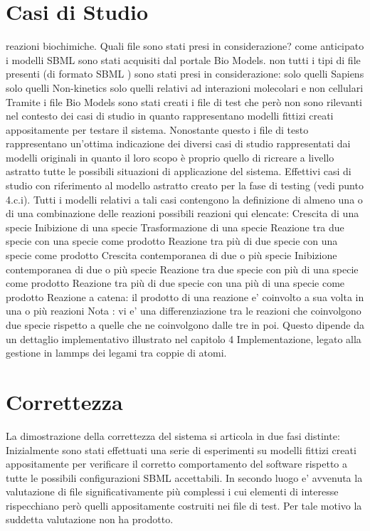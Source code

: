 \documentclass[Lau, oneside]{sapthesis}
\begin{document}
\section{Casi di Studio}
\label{sec:cast}
reazioni biochimiche.
Quali file sono stati presi in considerazione?
come anticipato i modelli SBML sono stati acquisiti dal portale Bio Models.
non tutti i tipi di file presenti (di formato SBML ) sono stati presi in considerazione:
solo quelli Sapiens
solo quelli Non-kinetics
solo quelli relativi ad interazioni molecolari e non cellulari
Tramite i file Bio Models sono stati creati i file di test che però non sono rilevanti nel contesto dei casi di studio in quanto rappresentano modelli fittizi creati appositamente per testare il sistema.
Nonostante questo i file di testo rappresentano un'ottima indicazione dei diversi casi di studio rappresentati dai modelli originali in quanto il loro scopo è proprio quello di ricreare a livello astratto tutte le possibili situazioni di applicazione del sistema.
Effettivi casi di studio con riferimento al modello astratto creato per la fase di testing (vedi punto 4.c.i). Tutti i modelli relativi a tali casi contengono la definizione di almeno una o di una combinazione delle reazioni possibili reazioni qui elencate:
Crescita di una specie
Inibizione di una specie
Trasformazione di una specie
Reazione tra due specie con una specie come prodotto 
Reazione tra più di due specie con una specie come prodotto
Crescita contemporanea di due o più specie
Inibizione contemporanea di due o più specie 
Reazione tra due specie con più di una specie come prodotto 
Reazione tra più di due specie con una più di una specie come prodotto
Reazione a catena: il prodotto di una reazione e’ coinvolto a sua volta in una o più reazioni
Nota : vi e’ una differenziazione tra le reazioni che coinvolgono due specie rispetto a quelle che ne coinvolgono dalle tre in poi. Questo dipende da un dettaglio implementativo illustrato nel capitolo  4 Implementazione, legato alla gestione in lammps dei legami tra coppie di atomi.


\newpage
\section{Correttezza}
\label{sec:corr}
La dimostrazione della correttezza del sistema si articola in due fasi distinte:
Inizialmente sono stati effettuati una serie di esperimenti su modelli fittizi creati appositamente per verificare il corretto comportamento del software rispetto a tutte le possibili configurazioni SBML accettabili.
In secondo luogo e' avvenuta la valutazione di file significativamente più complessi i cui elementi di interesse rispecchiano però quelli appositamente costruiti nei file di test. Per tale motivo la suddetta valutazione non ha prodotto.
\end{document}
